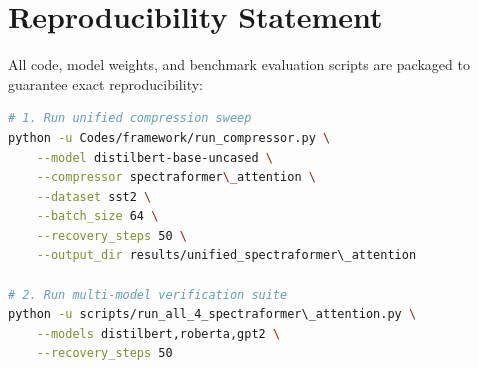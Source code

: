 \section{Reproducibility Statement}
All code, model weights, and benchmark evaluation scripts are packaged to guarantee exact reproducibility:
\begin{lstlisting}[language=bash]
# 1. Run unified compression sweep
python -u Codes/framework/run_compressor.py \
    --model distilbert-base-uncased \
    --compressor spectraformer\_attention \
    --dataset sst2 \
    --batch_size 64 \
    --recovery_steps 50 \
    --output_dir results/unified_spectraformer\_attention

# 2. Run multi-model verification suite
python -u scripts/run_all_4_spectraformer\_attention.py \
    --models distilbert,roberta,gpt2 \
    --recovery_steps 50
\end{lstlisting}
